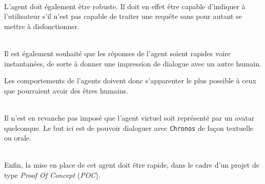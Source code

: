 ~\\\indent
L'agent doit également être robuste. Il doit en effet être capable d'indiquer à l'utilisateur s'il n'est pas capable de traiter une requête sans pour autant se mettre à disfonctionner.

~\\\indent 
Il est également souhaité que les réponses de l'agent soient rapides voire instantanées, de sorte à donner une impression de dialogue avec un autre humain. 

Les comportements de l'agents doivent donc s'apparenter le plus possible à ceux que pourraient avoir des êtres humains.

~\\\indent
Il n'est en revanche pas imposé que l'agent virtuel soit représenté par un avatar quelconque. Le but ici est de pouvoir dialoguer avec \texttt{Chronos} de façon textuelle ou orale.

~\\\indent 
Enfin, la mise en place de cet agent doit être rapide, dans le cadre d'un projet de type \emph{Proof Of Concept} (\emph{POC}).


